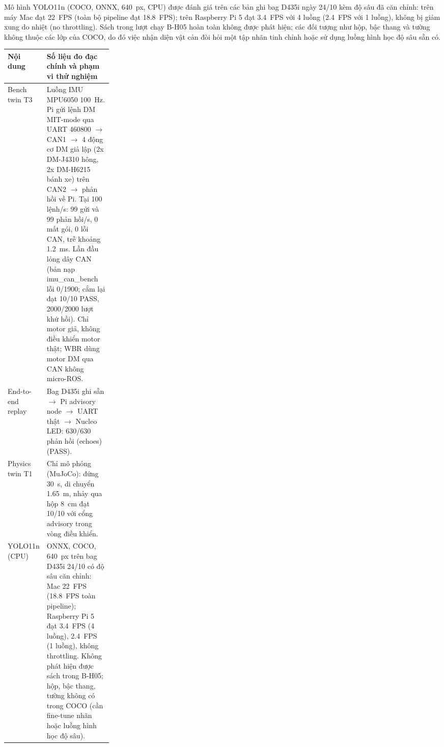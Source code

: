 \documentclass[11pt,a4paper]{article}
\begin{document}
Mô hình YOLO11n (COCO, ONNX, 640~px, CPU) được đánh giá trên các bản ghi bag D435i ngày 24/10 kèm độ sâu đã căn chỉnh: trên máy Mac đạt 22~FPS (toàn bộ pipeline đạt 18.8~FPS); trên Raspberry Pi 5 đạt 3.4~FPS với 4 luồng (2.4~FPS với 1 luồng), không bị giảm xung do nhiệt (no throttling). Sách trong lượt chạy B-H05 hoàn toàn không được phát hiện; các đối tượng như hộp, bậc thang và tường không thuộc các lớp của COCO, do đó việc nhận diện vật cản đòi hỏi một tập nhãn tinh chỉnh hoặc sử dụng luồng hình học độ sâu sẵn có.
\par\smallskip
\begin{tabularx}{\linewidth}{@{}p{0.24\linewidth}X@{}}
\toprule
\textbf{Nội dung} & \textbf{Số liệu đo đạc chính và phạm vi thử nghiệm}\\
\midrule
Bench twin T3 & Luồng IMU MPU6050 100~Hz. Pi gửi lệnh DM MIT-mode qua UART 460800 $\rightarrow$ CAN1 $\rightarrow$ 4 động cơ DM giả lập (2x DM-J4310 hông, 2x DM-H6215 bánh xe) trên CAN2 $\rightarrow$ phản hồi về Pi. Tại 100 lệnh/s: 99 gửi và 99 phản hồi/s, 0 mất gói, 0 lỗi CAN, trễ khoảng 1.2~ms. Lần đầu lỏng dây CAN (bản nạp imu\_can\_bench lỗi 0/1900; cắm lại đạt 10/10 PASS, 2000/2000 lượt khứ hồi). Chỉ motor giả, không điều khiển motor thật; WBR dùng motor DM qua CAN không micro-ROS.\\
\midrule
End-to-end replay & Bag D435i ghi sẵn $\rightarrow$ Pi advisory node $\rightarrow$ UART thật $\rightarrow$ Nucleo LED: 630/630 phản hồi (echoes) (PASS).\\
\midrule
Physics twin T1 & Chỉ mô phỏng (MuJoCo): đứng 30~s, di chuyển 1.65~m, nhảy qua hộp 8~cm đạt 10/10 với cổng advisory trong vòng điều khiển.\\
\midrule
YOLO11n (CPU) & ONNX, COCO, 640~px trên bag D435i 24/10 có độ sâu căn chỉnh: Mac 22~FPS (18.8~FPS toàn pipeline); Raspberry Pi 5 đạt 3.4~FPS (4 luồng), 2.4~FPS (1 luồng), không throttling. Không phát hiện được sách trong B-H05; hộp, bậc thang, tường không có trong COCO (cần fine-tune nhãn hoặc luồng hình học độ sâu).\\
\bottomrule
\end{tabularx}
\par\smallskip

\newpage
\end{document}
